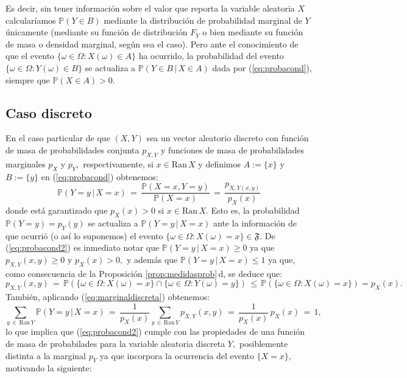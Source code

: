 \documentclass[spanish,10pt,letterpaper]{article}
\newcommand{\prob}{\mathbb{P}}
\begin{document}
Es decir, sin tener información sobre el valor que reporta la variable aleatoria $X$ calcularíamos $\prob(Y\in B)$ mediante la distribución de probabilidad marginal de $Y$ únicamente (mediante su función de distribución $F_Y$ o bien mediante su función de masa o densidad marginal, según sea el caso). Pero ante el conocimiento de que el evento $\{\omega\in\Omega:X(\omega)\in A\}$ ha ocurrido, la probabilidad del evento $\{\omega\in\Omega:Y(\omega)\in B\}$ se actualiza a $\prob(Y\in B\,|\,X\in A)$ dada por (\ref{eq:probacond}), siempre que $\prob(X\in A)>0.$ 


\subsection{Caso discreto}

En el caso particular de que $(X,Y)$ sea un vector aleatorio discreto con función de masa de probabilidades conjunta $p_{X,Y}$ y funciones de masa de probabilidades marginales $p_X$ y $p_Y,$ respectivamente, si $x\in\text{Ran}\,X$ y definimos $A:=\{x\}$ y $B:=\{y\}$ en (\ref{eq:probacond}) obtenemos:
\begin{equation}\label{eq:probacond2}
    \prob(Y=y\,|\,X=x) \,=\, \frac{\prob(X=x,Y=y)}{\prob(X=x)} \,=\, \frac{p_{X,Y(x,y)}}{p_X(x)}
\end{equation}
donde está garantizado que $p_X(x)>0$ si $x\in\text{Ran}\,X.$ Esto es, la probabilidad $\prob(Y=y)=p_Y(y)$ se actualiza a $\prob(Y=y\,|\,X=x)$ ante la información de que ocurrió (o así lo suponemos) el evento $\{\omega\in\Omega:X(\omega)=x\}\in\mathfrak{F}.$ De (\ref{eq:probacond2}) es inmediato notar que $\prob(Y=y\,|\,X=x)\geq 0$ ya que $p_{X,Y}(x,y)\geq 0$ y $p_X(x)>0,$ y además que $\prob(Y=y\,|\,X=x)\leq 1$ ya que, como consecuencia de la Proposición \ref{prop:medidasprob}\,d, se deduce que:
\begin{equation*}
    p_{X,Y}(x,y) \,=\, \prob(\{\omega\in\Omega:X(\omega)=x\}\cap\{\omega\in\Omega:Y(\omega)=y\}) \,\leq\, \prob(\{\omega\in\Omega:X(\omega)=x\}) = p_X(x).
\end{equation*}
También, aplicando (\ref{eq:marginaldiscreta}) obtenemos:
\begin{equation*}
    \sum_{y\,\in\,\text{Ran}\,Y}\prob(Y=y\,|\,X=x) \,=\, \frac{1}{p_X(x)}\sum_{y\,\in\,\text{Ran}\,Y}p_{X,Y}(x,y) \,=\, \frac{1}{p_X(x)}\,p_X(x) \,=\,1,
\end{equation*}
lo que implica que (\ref{eq:probacond2}) cumple con las propiedades de una función de masa de probabilades para la variable aleatoria discreta $Y,$ posiblemente distinta a la marginal $p_Y$ ya que incorpora la ocurrencia del evento $\{X=x\},$ motivando la siguiente: 
\end{document}
